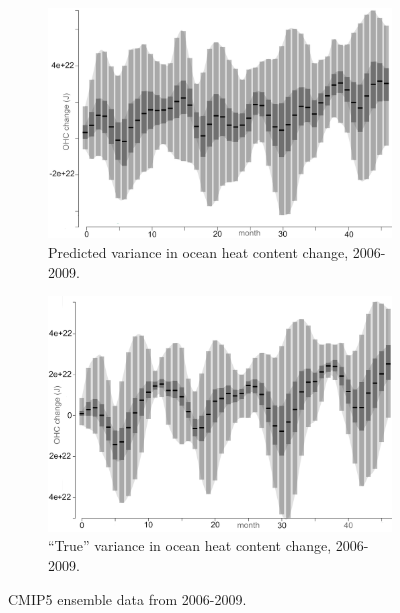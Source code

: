 \label{ohc_case_study}
\begin{figure}[h]
    \centering
    \begin{subfigure}{0.49\textwidth}
        \includegraphics[width=\textwidth]{images/sampling/cmip_prediction_2006_2010_cropped.png}
        \caption{Predicted variance in ocean heat content change, 2006-2009.}
        \label{ohc_predicted_a}
    \end{subfigure}
    \begin{subfigure}{0.49\textwidth}
        \includegraphics[width=\textwidth]{images/sampling/cmip_ground_truth_2006_2010.png}
        \caption{``True'' variance in ocean heat content change, 2006-2009.}
        \label{ohc_true_a}
    \end{subfigure}
     \caption{CMIP5 ensemble data from 2006-2009.}
     \label{ohc_a}
\end{figure}

